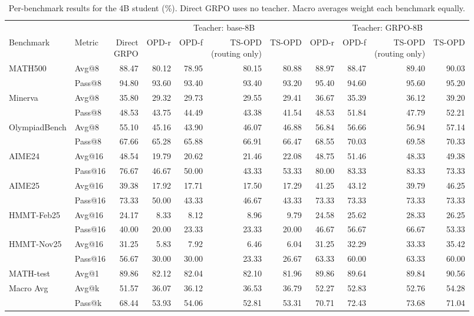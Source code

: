 \begin{table}[h]
\centering
\scriptsize
\setlength{\tabcolsep}{3.5pt}
\caption{Per-benchmark results for the 4B student (\%). Direct GRPO uses no teacher. Macro averages weight each benchmark equally.}
\label{tab:app-full-4B}
\begin{tabular}{llrrrrrrrrr}
\toprule
 & & & \multicolumn{4}{c}{Teacher: base-8B} & \multicolumn{4}{c}{Teacher: GRPO-8B} \\
\cmidrule(lr){4-7}\cmidrule(lr){8-11}
Benchmark & Metric & \shortstack{Direct\\GRPO} & OPD-r & OPD-f & \shortstack{TS-OPD\\(routing only)} & TS-OPD & OPD-r & OPD-f & \shortstack{TS-OPD\\(routing only)} & TS-OPD \\
\midrule
MATH500 & Avg@8 & 88.47 & 80.12 & 78.95 & 80.15 & 80.88 & 88.97 & 88.47 & 89.40 & 90.03 \\
 & Pass@8 & 94.80 & 93.60 & 93.40 & 93.40 & 93.20 & 95.40 & 94.60 & 95.60 & 95.20 \\
Minerva & Avg@8 & 35.80 & 29.32 & 29.73 & 29.55 & 29.41 & 36.67 & 35.39 & 36.12 & 39.20 \\
 & Pass@8 & 48.53 & 43.75 & 44.49 & 43.38 & 41.54 & 48.53 & 51.84 & 47.79 & 52.21 \\
OlympiadBench & Avg@8 & 55.10 & 45.16 & 43.90 & 46.07 & 46.88 & 56.84 & 56.66 & 56.94 & 57.14 \\
 & Pass@8 & 67.66 & 65.28 & 65.88 & 66.91 & 66.47 & 68.55 & 70.03 & 69.58 & 70.33 \\
AIME24 & Avg@16 & 48.54 & 19.79 & 20.62 & 21.46 & 22.08 & 48.75 & 51.46 & 48.33 & 49.38 \\
 & Pass@16 & 76.67 & 46.67 & 50.00 & 43.33 & 53.33 & 80.00 & 83.33 & 83.33 & 73.33 \\
AIME25 & Avg@16 & 39.38 & 17.92 & 17.71 & 17.50 & 17.29 & 41.25 & 43.12 & 39.79 & 46.25 \\
 & Pass@16 & 73.33 & 50.00 & 43.33 & 46.67 & 43.33 & 73.33 & 73.33 & 73.33 & 73.33 \\
HMMT-Feb25 & Avg@16 & 24.17 & 8.33 & 8.12 & 8.96 & 9.79 & 24.58 & 25.62 & 28.33 & 26.25 \\
 & Pass@16 & 40.00 & 20.00 & 23.33 & 23.33 & 20.00 & 46.67 & 56.67 & 66.67 & 53.33 \\
HMMT-Nov25 & Avg@16 & 31.25 & 5.83 & 7.92 & 6.46 & 6.04 & 31.25 & 32.29 & 33.33 & 35.42 \\
 & Pass@16 & 56.67 & 30.00 & 30.00 & 23.33 & 26.67 & 63.33 & 60.00 & 63.33 & 60.00 \\
MATH-test & Avg@1 & 89.86 & 82.12 & 82.04 & 82.10 & 81.96 & 89.86 & 89.64 & 89.84 & 90.56 \\
\midrule
Macro Avg & Avg@k & 51.57 & 36.07 & 36.12 & 36.53 & 36.79 & 52.27 & 52.83 & 52.76 & 54.28 \\
 & Pass@k & 68.44 & 53.93 & 54.06 & 52.81 & 53.31 & 70.71 & 72.43 & 73.68 & 71.04 \\
\bottomrule
\end{tabular}
\end{table}
